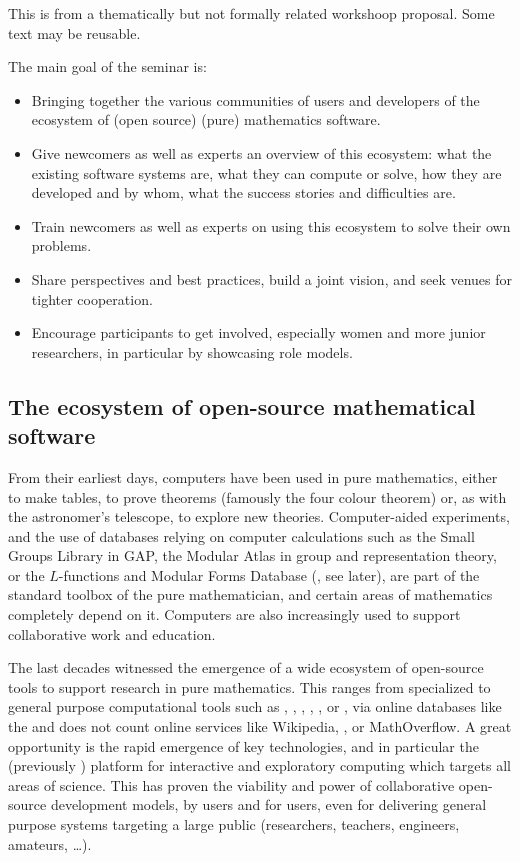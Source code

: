 \begin{oldpart}{This is from a thematically but not formally related workshoop proposal. Some text may be reusable.}

The main goal of the seminar is:
\begin{itemize}
\item Bringing together the various communities of users and
  developers of the ecosystem of (open source) (pure) mathematics
  software.
\item Give newcomers as well as experts an overview of this ecosystem:
  what the existing software systems are, what they can compute or solve, how
  they are developed and by whom, what the success stories and
  difficulties are.
\item Train newcomers as well as experts on using this ecosystem to
  solve their own problems.
\item Share perspectives and best practices, build a joint vision, and
  seek venues for tighter cooperation.
\item Encourage participants to get involved, especially
  women and more junior researchers, in particular by showcasing role models.
\end{itemize}


\subsection{The ecosystem of open-source mathematical software}

From their earliest days, computers have been used in pure
mathematics, either to make tables, to prove theorems (famously the
four colour theorem) or, as with the astronomer's telescope, to
explore new theories. Computer-aided experiments, and the use of
databases relying on computer calculations such as the Small Groups
Library in GAP, the Modular Atlas in group and representation theory,
or the $L$-functions and Modular Forms Database (\LMFDB, see later),
are part of the standard toolbox of the pure mathematician, and
certain areas of mathematics completely depend on it. Computers are
also increasingly used to support collaborative work and education.

The last decades witnessed the emergence of a wide ecosystem of
open-source tools to support research in pure mathematics. This ranges
from specialized to general purpose computational tools such as \GAP,
\PariGP, \Linbox, \MPIR, \Sage, or \Singular, via online databases
like the \LMFDB and does not count online services like Wikipedia,
\Arxiv, or MathOverflow. A great opportunity is the rapid emergence of
key technologies, and in particular the \Jupyter (previously \IPython)
platform for interactive and exploratory computing which targets all
areas of science. This has proven the viability and power of
collaborative open-source development models, by users and for users,
even for delivering general purpose systems targeting a large public
(researchers, teachers, engineers, amateurs, \ldots).


\end{oldpart}
